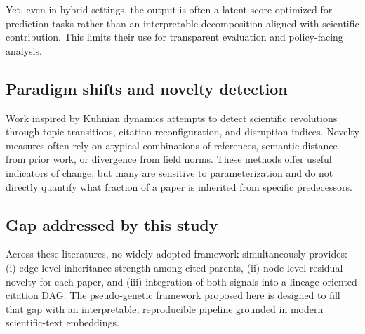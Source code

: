 Yet, even in hybrid settings, the output is often a latent score optimized for prediction tasks rather than an interpretable decomposition aligned with scientific contribution. This limits their use for transparent evaluation and policy-facing analysis.

\subsection{Paradigm shifts and novelty detection}
Work inspired by Kuhnian dynamics attempts to detect scientific revolutions through topic transitions, citation reconfiguration, and disruption indices. Novelty measures often rely on atypical combinations of references, semantic distance from prior work, or divergence from field norms. These methods offer useful indicators of change, but many are sensitive to parameterization and do not directly quantify what fraction of a paper is inherited from specific predecessors.

\subsection{Gap addressed by this study}
Across these literatures, no widely adopted framework simultaneously provides: (i) edge-level inheritance strength among cited parents, (ii) node-level residual novelty for each paper, and (iii) integration of both signals into a lineage-oriented citation DAG. The pseudo-genetic framework proposed here is designed to fill that gap with an interpretable, reproducible pipeline grounded in modern scientific-text embeddings.
